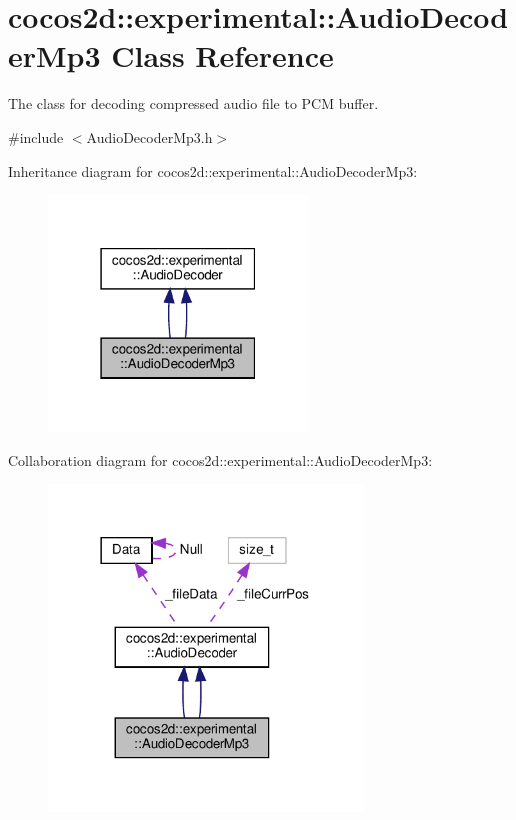 \hypertarget{classcocos2d_1_1experimental_1_1AudioDecoderMp3}{}\section{cocos2d\+:\+:experimental\+:\+:Audio\+Decoder\+Mp3 Class Reference}
\label{classcocos2d_1_1experimental_1_1AudioDecoderMp3}


The class for decoding compressed audio file to P\+CM buffer.  




{\ttfamily \#include $<$Audio\+Decoder\+Mp3.\+h$>$}



Inheritance diagram for cocos2d\+:\+:experimental\+:\+:Audio\+Decoder\+Mp3\+:
\nopagebreak
\begin{figure}[H]
\begin{center}
\leavevmode
\includegraphics[width=195pt]{classcocos2d_1_1experimental_1_1AudioDecoderMp3__inherit__graph}
\end{center}
\end{figure}


Collaboration diagram for cocos2d\+:\+:experimental\+:\+:Audio\+Decoder\+Mp3\+:
\nopagebreak
\begin{figure}[H]
\begin{center}
\leavevmode
\includegraphics[width=237pt]{classcocos2d_1_1experimental_1_1AudioDecoderMp3__coll__graph}
\end{center}
\end{figure}
